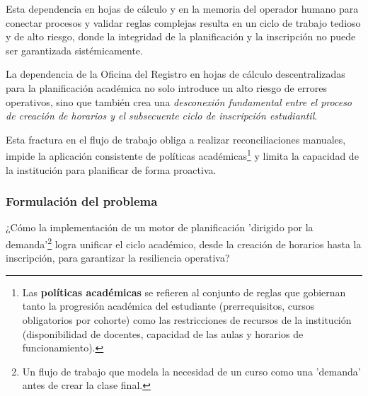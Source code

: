 Esta dependencia en hojas de cálculo y en la memoria del operador humano para conectar procesos y validar reglas complejas resulta en un ciclo de trabajo tedioso y de alto riesgo, donde la integridad de la planificación y la inscripción no puede ser garantizada sistémicamente.

La dependencia de la Oficina del Registro en hojas de cálculo descentralizadas para la planificación académica no solo introduce un alto riesgo de errores operativos, sino que también crea una \textit{desconexión fundamental entre el proceso de creación de horarios y el subsecuente ciclo de inscripción estudiantil}.

Esta fractura en el flujo de trabajo obliga a realizar reconciliaciones manuales, impide la aplicación consistente de políticas académicas\footnote{Las \textbf{políticas académicas} se refieren al conjunto de reglas que gobiernan tanto la progresión académica del estudiante (prerrequisitos, cursos obligatorios por cohorte) como las restricciones de recursos de la institución (disponibilidad de docentes, capacidad de las aulas y horarios de funcionamiento).} y limita la capacidad de la institución para planificar de forma proactiva.

\subsubsection{Formulación del problema}

¿Cómo la implementación de un motor de planificación 'dirigido por la demanda'\footnote{Un flujo de trabajo que modela la necesidad de un curso como una 'demanda' antes de crear la clase final.} logra unificar el ciclo académico, desde la creación de horarios hasta la inscripción, para garantizar la resiliencia operativa?

